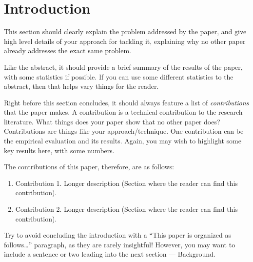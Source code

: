 \section{Introduction}
\label{sec:introduction}

%


This section should clearly explain the problem addressed 
by the paper, and give high level details of your approach
for tackling it, explaining why no other paper already
addresses the exact same problem.

Like the abstract, it should provide a brief summary of 
the results of the paper, with some statistics if possible. 
If you can use some different statistics to the 
abstract, then that helps vary things for the reader.

Right before this section concludes, it should always
feature a list of {\em contributions} that the paper makes.
A contribution is a technical contribution to the 
research literature. What things does your paper show
that no other paper does? Contributions are things 
like your approach/technique. 
One contribution can be the empirical evaluation and
its results. Again, you may wish to highlight some 
key results here, with some numbers. 

The contributions of this paper, therefore, are as follows:

\begin{enumerate}

    \item Contribution 1. Longer description
    (Section where the reader can find this contribution).
    
    \item Contribution 2. Longer description
    (Section where the reader can find this contribution).

\end{enumerate}    

Try to avoid concluding the introduction with a 
``This paper is organized as follows\ldots'' paragraph,
as they are rarely insightful! 
%
However, you may want to include a sentence or two 
leading into the next section --- Background.